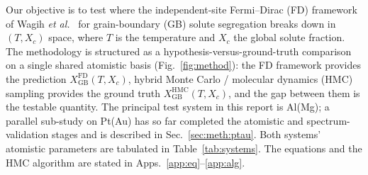 %
%
%



Our objective is to test where the independent-site Fermi--Dirac (FD)
framework of Wagih \emph{et al.}~\cite{Wagih2020} for grain-boundary (GB)
solute segregation breaks down in $(T, X_c)$ space, where $T$ is the
temperature and $X_c$ the global solute fraction. The methodology is
structured as a hypothesis-versus-ground-truth comparison on a single
shared atomistic basis (Fig.~\ref{fig:method}): the FD framework
provides the prediction $X_\mathrm{GB}^\mathrm{FD}(T, X_c)$, hybrid
Monte Carlo / molecular dynamics (HMC) sampling provides the ground
truth $X_\mathrm{GB}^\mathrm{HMC}(T, X_c)$, and the gap between them
is the testable quantity. The principal test system in this report
is Al(Mg); a parallel sub-study on Pt(Au) has so far completed the
atomistic and spectrum-validation stages and is described in
Sec.~\ref{sec:meth:ptau}. Both systems' atomistic parameters are
tabulated in Table~\ref{tab:systems}. The equations and the HMC
algorithm are stated in Apps.~\ref{app:eq}--\ref{app:alg}.


